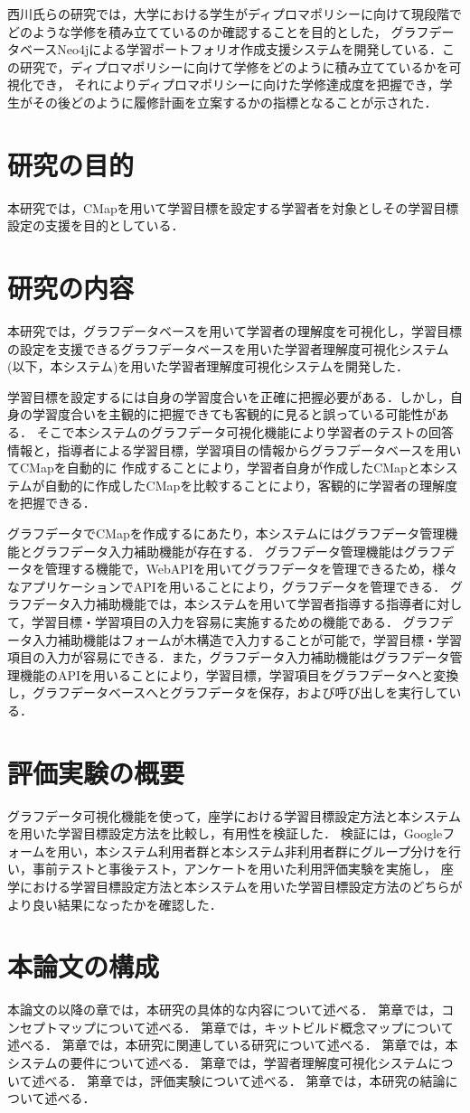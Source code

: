 西川氏らの研究では，大学における学生がディプロマポリシーに向けて現段階でどのような学修を積み立てているのか確認することを目的とした，
グラフデータベースNeo4jによる学習ポートフォリオ作成支援システムを開発している\cite{nisi}．この研究で，ディプロマポリシーに向けて学修をどのように積み立てているかを可視化でき，
それによりディプロマポリシーに向けた学修達成度を把握でき，学生がその後どのように履修計画を立案するかの指標となることが示された．

\section{研究の目的}
本研究では，CMapを用いて学習目標を設定する学習者を対象としその学習目標設定の支援を目的としている．

\section{研究の内容}
本研究では，グラフデータベースを用いて学習者の理解度を可視化し，学習目標の設定を支援できるグラフデータベースを用いた学習者理解度可視化システム(以下，本システム)を用いた学習者理解度可視化システムを開発した．

学習目標を設定するには自身の学習度合いを正確に把握必要がある．しかし，自身の学習度合いを主観的に把握できても客観的に見ると誤っている可能性がある．
そこで本システムのグラフデータ可視化機能により学習者のテストの回答情報と，指導者による学習目標，学習項目の情報からグラフデータベースを用いてCMapを自動的に
作成することにより，学習者自身が作成したCMapと本システムが自動的に作成したCMapを比較することにより，客観的に学習者の理解度を把握できる．

グラフデータでCMapを作成するにあたり，本システムにはグラフデータ管理機能とグラフデータ入力補助機能が存在する．
グラフデータ管理機能はグラフデータを管理する機能で，WebAPIを用いてグラフデータを管理できるため，様々なアプリケーションでAPIを用いることにより，グラフデータを管理できる．
グラフデータ入力補助機能では，本システムを用いて学習者指導する指導者に対して，学習目標・学習項目の入力を容易に実施するための機能である．
グラフデータ入力補助機能はフォームが木構造で入力することが可能で，学習目標・学習項目の入力が容易にできる．また，グラフデータ入力補助機能はグラフデータ管理機能のAPIを用いることにより，学習目標，学習項目をグラフデータへと変換し，グラフデータベースへとグラフデータを保存，および呼び出しを実行している．


\section{評価実験の概要}
グラフデータ可視化機能を使って，座学における学習目標設定方法と本システムを用いた学習目標設定方法を比較し，有用性を検証した．
検証には，Googleフォームを用い，本システム利用者群と本システム非利用者群にグループ分けを行い，事前テストと事後テスト，アンケートを用いた利用評価実験を実施し，
座学における学習目標設定方法と本システムを用いた学習目標設定方法のどちらがより良い結果になったかを確認した．

\section{本論文の構成}
本論文の以降の章では，本研究の具体的な内容について述べる．
第章では，コンセプトマップについて述べる．
第章では，キットビルド概念マップについて述べる．
第章では，本研究に関連している研究について述べる．
第章では，本システムの要件について述べる．
第章では，学習者理解度可視化システムについて述べる．
第章では，評価実験について述べる．
第章では，本研究の結論について述べる．
